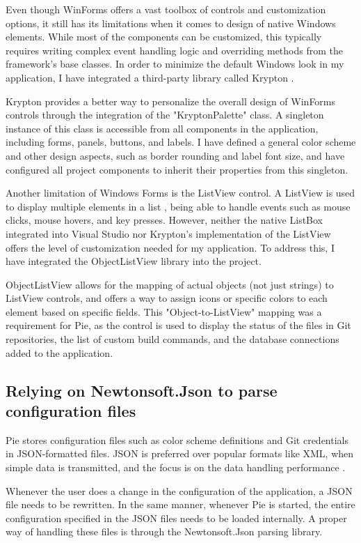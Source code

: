 Even though WinForms offers a vast toolbox of controls and customization options, it still has its limitations when it comes to design of native Windows elements. While most of the components can be customized, this typically requires writing complex event handling logic and overriding methods from the framework's base classes. In order to minimize the default Windows look in my application, I have integrated a third-party library called Krypton \cite{krypton}.

Krypton provides a better way to personalize the overall design of WinForms controls through the integration of the "KryptonPalette" class. A singleton instance of this class is accessible from all components in the application, including forms, panels, buttons, and labels. I have defined a general color scheme and other design aspects, such as border rounding and label font size, and have configured all project components to inherit their properties from this singleton.

Another limitation of Windows Forms is the ListView control. A ListView is used to display multiple elements in a list \cite{listview}, being able to handle events such as mouse clicks, mouse hovers, and key presses. However, neither the native ListBox integrated into Visual Studio nor Krypton's implementation of the ListView offers the level of customization needed for my application. To address this, I have integrated the ObjectListView \cite{objectlistview} library into the project.

ObjectListView allows for the mapping of actual objects (not just strings) to ListView controls, and offers a way to assign icons or specific colors to each element based on specific fields. This "Object-to-ListView" mapping was a requirement for Pie, as the control is used to display the status of the files in Git repositories, the list of custom build commands, and the database connections added to the application.

\subsection{Relying on Newtonsoft.Json to parse configuration files}

Pie stores configuration files such as color scheme definitions and Git credentials in JSON-formatted files. JSON is preferred over popular formats like XML, when simple data is transmitted, and the focus is on the data handling performance \cite{json-vs-xml}.

Whenever the user does a change in the configuration of the application, a JSON file needs to be rewritten. In the same manner, whenever Pie is started, the entire configuration specified in the JSON files needs to be loaded internally. A proper way of handling these files is through the Newtonsoft.Json \cite{newtonsoft-json} parsing library.


